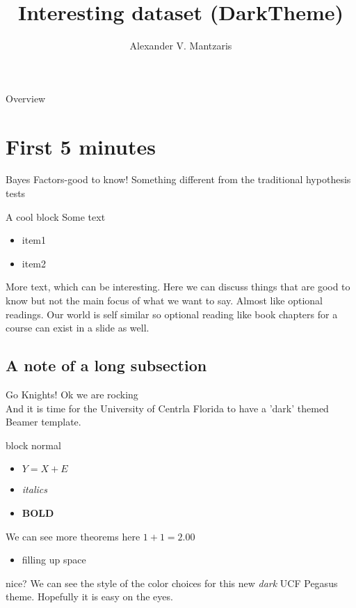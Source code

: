 \documentclass{beamer}
\title[GoKnights]{Interesting dataset (DarkTheme)}
\author{Alexander V. Mantzaris}
\date{\vspace{-8cm}}
\begin{document}
\begin{frame}
  \titlepage
\end{frame}

\begin{frame}{Overview}
\tableofcontents
\end{frame}

\section{First 5 minutes}

\begin{frame}{Bayes Factors-good to know!} 
  Something different from the traditional hypothesis tests
  \begin{block}{A cool block}
    Some text
    \begin{itemize}
    \item item1
    \item item2
    \end{itemize}
  \end{block}
  More text, which can be interesting. Here we can discuss things that are good to know but not the main focus of what we want to say. Almost like optional readings. Our world is self similar so optional reading like book chapters for a course can exist in a slide as well.
\end{frame}


\subsection{A note of a long subsection}
\begin{frame}{Go Knights!}
  \vspace{-.2cm}
  Ok we are rocking\\
  And it is time for the University of Centrla Florida to have a 'dark' themed Beamer template.
  \begin{block}{block normal}
    \begin{itemize}
    \item $Y = X + E$
    \item \emph{italics}
      \item \textbf{BOLD}
    \end{itemize}
  \end{block}
  \begin{block}{We can see more theorems here}
    $1+1 = 2.00$
    \begin{itemize}
    \item filling up space
    \end{itemize}
    nice? We can see the style of the color choices for this new \emph{dark} UCF Pegasus theme. Hopefully it is easy on the eyes.
  \end{block}
  
\end{frame}
\end{document}
